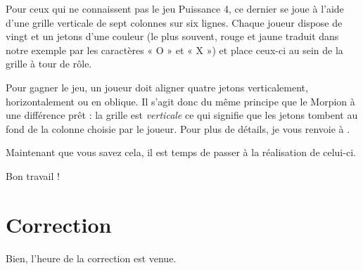 Pour ceux qui ne connaissent pas le jeu Puissance 4, ce dernier se joue
à l'aide d'une grille verticale de sept colonnes sur six lignes. Chaque
joueur dispose de vingt et un jetons d'une couleur (le plus souvent,
rouge et jaune traduit dans notre exemple par les caractères « O » et «
X ») et place ceux-ci au sein de la grille à tour de rôle.

Pour gagner le jeu, un joueur doit aligner quatre jetons verticalement,
horizontalement ou en oblique. Il s'agit donc du même principe que le
Morpion à une différence prêt : la grille est \emph{verticale} ce qui
signifie que les jetons tombent au fond de la colonne choisie par le
joueur. Pour plus de détails, je vous renvoie à
.

Maintenant que vous savez cela, il est temps de passer à la réalisation
de celui-ci.

Bon travail !

\section{Correction}
\label{correction-18}

Bien, l'heure de la correction est venue.

